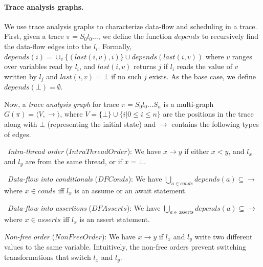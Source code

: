 \documentclass{llncs}
\newcommand\ProgState{\ensuremath{S}}
\newcommand\trace{\pi}
\newcommand{\redn}{\mathit{DFAsserts}}
\newcommand{\blackn}{\mathit{IntraThreadOrder}}
\newcommand{\bluen}{\mathit{DFConds}}
\newcommand{\pinkn}{\mathit{NonFreeOrder}}
\newcommand{\last}{\ensuremath{\mathit{last}}\xspace}
\newcommand{\depends}{\ensuremath{\mathit{depends}}\xspace}
\begin{document}
\paragraph{Trace analysis graphs.}
We use trace analysis graphs to characterize data-flow and
scheduling in a trace.
First, given a trace $\trace = \ProgState_0 l_0 
\ldots$, we define
the function $\depends$ to recursively find the data-flow
edges into the $l_i$.
Formally, $\depends(i) = \cup_{v}\{ (\last(i,v), i) \} \cup
\depends(\last(i,v))$ where $v$ ranges over variables read by $l_i$, and
$\last(i,v)$ returns $j$ if $l_i$ reads the value of $v$ written by
$l_j$ and $\last(i,v) = \bot$ if no such $j$ exists.
As the base case, we define $\depends(\bot) = \emptyset$.


Now, a {\em trace analysis graph} for trace $\trace =
\ProgState_0l_0\ldots \ProgState_n$ is a
multi-graph  $G(\trace) = \langle V, \to \rangle$, where $V = \{ \bot \}
\cup \{ i | 0 \leq i \leq n \}$ are the positions in the trace along
with $\bot$ (representing the initial state) and $\to$ contains the
following types of edges.
\begin{compactenum}
\item~{\em Intra-thread order} ($\blackn$): We have $x \to y$ if either
  $x < y$, and $l_x$ and $l_y$ are from the same thread, or if $x =
  \bot$.
\item~{\em Data-flow into conditionals} ($\bluen$): We have
  $\bigcup_{a\in\mathit{conds}} \depends(a) \subseteq \to$ where $x \in
  conds$ iff $l_x$ is an assume or an await statement.
\item~{\em Data-flow into assertions} ($\redn$): We have
  $\bigcup_{a\in\mathrm{asserts}} \depends(a) \subseteq \to$ where
  $x \in asserts$ iff $l_x$ is an assert statement.
\item {\em Non-free order} ($\pinkn$): We have $x \to y$ if $l_x$ and
  $l_y$ write two different values to the same variable. 
  Intuitively, the non-free orders prevent switching transformations
  that switch $l_x$ and $l_y$.
\end{compactenum}
\end{document}
